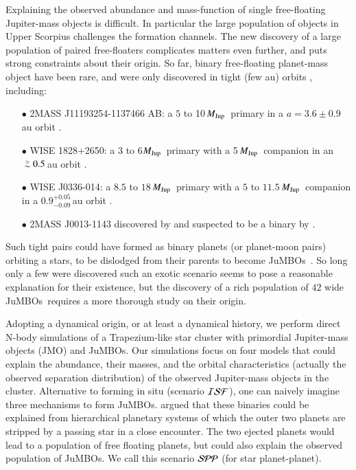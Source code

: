 \documentclass[submission,phys]{lib/SciPost}
\newcommand{\MJup}{\mbox{${M}_{\rm Jup}$}}
\def\apgt{\ {\raise-.5ex\hbox{$\buildrel>\over\sim$}}\ }
\newcommand{\jumbos}{\mbox{JuMBOs}}
\begin{document}
Explaining the observed abundance and mass-function of single
free-floating Jupiter-mass objects is difficult.  In particular the
large population of objects in Upper Scorpius challenges the formation
channels. The new discovery of a large population of paired
free-floaters complicates matters even further, and puts strong
constraints about their origin. So far, binary free-floating
planet-mass object have been rare, and were only discovered in tight
(few au) orbits \cite{2021ApJS..253....7K}, including:  
\begin{itemize}
\item[$\bullet$]2MASS J11193254-1137466 AB: a $5$ to 10\,\MJup\,
  primary in a $a=3.6\pm0.9$\,au orbit \cite{2017ApJ...843L...4B}.
\item[$\bullet$]WISE 1828+2650: a 3 to 6\MJup\, primary with a
  5\,\MJup\ companion in an $\apgt 0.5$\,au orbit
  \cite{2013ApJ...764..101B}.
\item[$\bullet$] WISE J0336-014: a $8.5$ to
  $18$\,\MJup\ primary with a $5$ to $11.5$\,\MJup\, companion in a
  $0.9^{+0.05}_{-0.09}$\,au orbit \cite{2023ApJ...947L..30C}.
\item[$\bullet$]2MASS J0013-1143 discovered by \cite{2017AJ....154..112K} and
  suspected to be a binary by \cite{2019A&A...629A.145E}.
\end{itemize}

Such tight pairs could have formed as binary planets (or planet-moon
pairs) orbiting a stars, to be dislodged from their parents to become
\jumbos\, \cite{2016ApJ...819..125C}.  So long only a few were
discovered such an exotic scenario seems to pose a reasonable
explanation for their existence, but the discovery of a rich
population of $42$ wide \jumbos\, \cite{2023arXiv231001231P} requires
a more thorough study on their origin.

Adopting a dynamical origin, or at least a dynamical history, we
perform direct N-body simulations of a Trapezium-like star cluster
with primordial Jupiter-mass objects (JMO) and \jumbos. Our
simulations focus on four models that could explain the abundance,
their masses, and the orbital characteristics (actually the observed
separation distribution) of the observed Jupiter-mass objects in the
cluster. Alternative to forming in situ
(scenario ${\cal ISF}$), one can naively imagine three mechanisms to
form \jumbos. \cite{2023arXiv231006016W} argued that these binaries
could be explained from hierarchical planetary systems of which the
outer two planets are stripped by a passing star in a close
encounter. The two ejected planets would lead to a population of free
floating planets, but could also explain the observed population of
\jumbos.  We call this scenario ${\cal SPP}$ (for star planet-planet).
\end{document}
